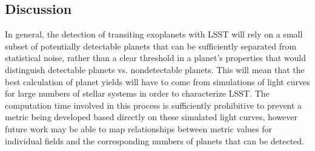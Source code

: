 \subsection{Discussion}
\label{sec:\secname:discussion}
In general, the detection of transiting exoplanets with LSST will rely on
a small subset of potentially detectable planets that can be sufficiently
separated from statistical noise, rather than a clear threshold in a planet's
properties that would distinguish detectable planets vs. nondetectable planets.
This will mean that the best calculation of planet yields will have to come
from simulations of light curves for large numbers of stellar systems in order
to characterize LSST. The computation time involved in this process is sufficiently
prohibitive to prevent a metric being developed based directly on these
simulated light curves, however future work may be able to map relationships
between metric values for individual fields and the corresponding numbers
of planets that can be detected.

%
%
%
%
%

\navigationbar
